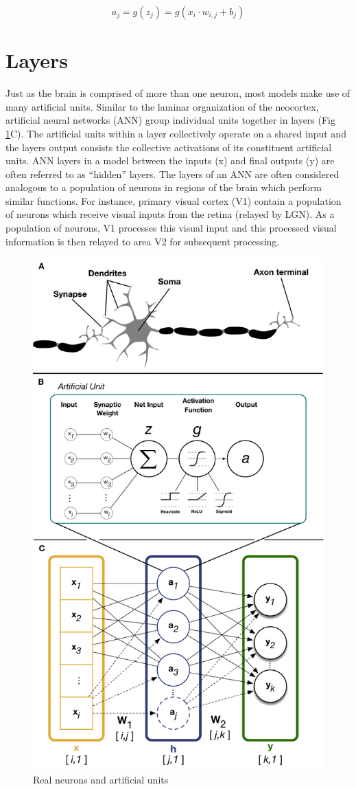 \documentclass{templates/ucdenverthesis}
\begin{document}
\[
a_j = g(z_j) = g(x_i \cdot w_{i,j} + b_j)
\]

\hypertarget{sec:layers}{%
\section{Layers}\label{sec:layers}}

Just as the brain is comprised of more than one neuron, most models make use of many artificial units. Similar to the laminar organization of the neocortex, artificial neural networks (ANN) group individual units together in layers (Fig \ref{fig:fig2-1}C). The artificial units within a layer collectively operate on a shared input and the layers output consists the collective activations of its constituent artificial units. ANN layers in a model between the inputs (x) and final outputs (y) are often referred to as ``hidden'' layers. The layers of an ANN are often considered analogous to a population of neurons in regions of the brain which perform similar functions. For instance, primary visual cortex (V1) contain a population of neurons which receive visual inputs from the retina (relayed by LGN). As a population of neurons, V1 processes this visual input and this processed visual information is then relayed to area V2 for subsequent processing.

\begin{figure}

{\centering \includegraphics[width=0.75\linewidth]{img/figure_2.1v2} 

}

\caption{Real neurons and artificial units}\label{fig:fig2-1}
\end{figure}
\end{document}
